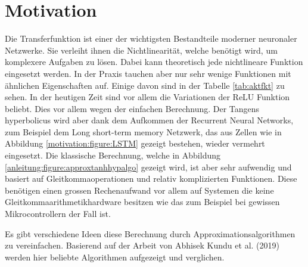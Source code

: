 %
%
%
\section{Motivation\label{transfer:section:teil0}}

Die Transferfunktion ist einer der wichtigsten Bestandteile moderner
neuronaler Netzwerke.
%
%
Sie verleiht ihnen die Nichtlinearität, welche
%
benötigt wird, um komplexere Aufgaben zu lösen.
Dabei kann theoretisch jede nichtlineare Funktion eingesetzt werden.
In der Praxis tauchen
aber nur sehr wenige Funktionen mit ähnlichen Eigenschaften auf.
Einige davon sind in der Tabelle \ref{tab:aktfkt} zu sehen.
In der
heutigen Zeit sind vor allem die Variationen der ReLU Funktion
beliebt.
Dies vor allem wegen der einfachen Berechnung.
Der Tangens hyperbolicus wird aber dank dem Aufkommen der Recurrent
Neural Networks, zum Beispiel dem Long short-term memory Netzwerk,
das aus Zellen wie in Abbildung \ref{motivation:figure:LSTM} gezeigt
bestehen, wieder vermehrt eingesetzt.
Die klassische Berechnung, welche in Abbildung
\ref{anleitung:figure:approxtanhhypalgo} gezeigt wird, ist aber
sehr aufwendig und basiert auf Gleitkommaoperationen und relativ
komplizierten Funktionen. Diese benötigen einen grossen Rechenaufwand
vor allem auf Systemen die keine Gleitkommaarithmetikhardware
besitzen wie das zum Beispiel bei gewissen Mikrocontrollern der
Fall ist.

Es gibt verschiedene Ideen diese Berechnung durch Approximationsalgorithmen
zu vereinfachen. Basierend auf der Arbeit von Abhisek Kundu et al.
(2019) \cite{transfer:DBLP:journals/corr/abs-1909-07729} werden
hier beliebte Algorithmen aufgezeigt und verglichen.

